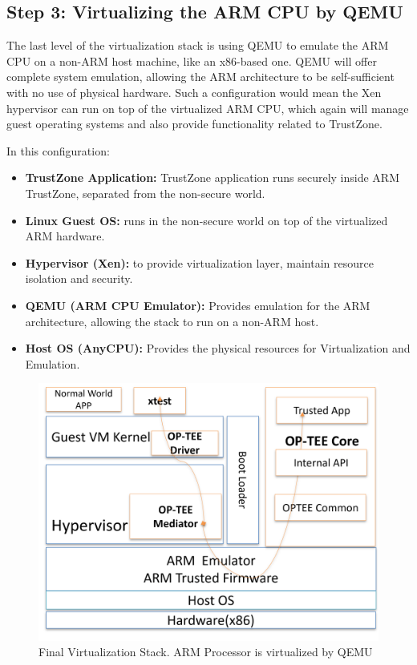 \documentclass[acmtog]{acmart}
\begin{document}
\subsection{Step 3: Virtualizing the ARM CPU by QEMU}

The last level of the virtualization stack is using QEMU to emulate the ARM CPU on a non-ARM host machine, like an x86-based one. QEMU will offer complete system emulation, allowing the ARM architecture to be self-sufficient with no use of physical hardware. Such a configuration would mean the Xen hypervisor can run on top of the virtualized ARM CPU, which again will manage guest operating systems and also provide functionality related to TrustZone.

In this configuration:
\begin{itemize}
    \item \textbf{TrustZone Application:}  TrustZone application runs securely inside ARM TrustZone, separated from the non-secure world.
    \item \textbf{Linux Guest OS:} runs in the non-secure world on top of the virtualized ARM hardware.
    \item \textbf{Hypervisor (Xen):} to provide virtualization layer, maintain resource isolation and security.
    \item \textbf{QEMU (ARM CPU Emulator):} Provides emulation for the ARM architecture, allowing the stack to run on a non-ARM host.
    \item \textbf{Host OS (AnyCPU):} Provides the physical resources for Virtualization and Emulation.
\end{itemize}

\begin{figure}[ht]
  \centering
  \includegraphics[width=\columnwidth]{images/3.png}
  \caption{Final Virtualization Stack. ARM Processor is virtualized by QEMU}
  \label{fig:virtual_stack}
\end{figure}
\end{document}
